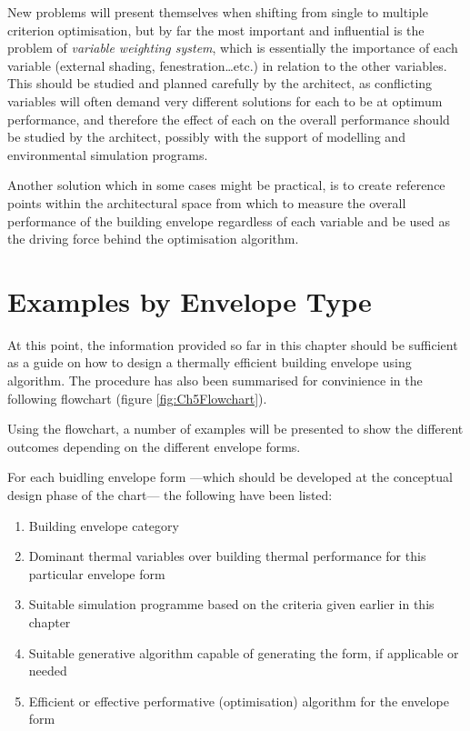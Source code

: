 New problems will present themselves when shifting from single to multiple criterion optimisation, but by far the most important and influential is the problem of \emph{variable weighting system}, which is essentially the importance of each variable (external shading, fenestration\ldots etc.) in relation to the other variables. This should be studied and planned carefully by the architect, as conflicting variables will often demand very different solutions for each to be at optimum performance, and therefore the effect of each on the overall performance should be studied by the architect, possibly with the support of modelling and environmental simulation programs.

Another solution which in some cases might be practical, is to create reference points within the architectural space from which to measure the overall performance of the building envelope regardless of each variable and be used as the driving force behind the optimisation algorithm.


\clearpage
\section{Examples by Envelope Type}

At this point, the information provided so far in this chapter should be sufficient as a guide on how to design a thermally efficient building envelope using algorithm. The procedure has also been summarised for convinience in the following flowchart (figure \ref{fig:Ch5Flowchart}).

Using the flowchart, a number of examples will be presented to show the different outcomes depending on the different envelope forms.

For each buidling envelope form ---which should be developed at the conceptual design phase of the chart--- the following have been listed:

\vspace{-0.4cm}
\begin{enumerate}
	\item Building envelope category	
	\item Dominant thermal variables over building thermal performance for this particular envelope form
	\item Suitable simulation programme based on the criteria given earlier in this chapter
	\item Suitable generative algorithm capable of generating the form, if applicable or needed
	\item Efficient or effective performative (optimisation) algorithm for the envelope form
\end{enumerate}

